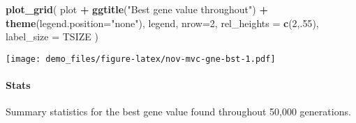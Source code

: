 \documentclass[]{book}
\newenvironment{Shaded}{\begin{snugshade}}{\end{snugshade}}
\newcommand{\DataTypeTok}[1]{\textcolor[rgb]{0.13,0.29,0.53}{#1}}
\newcommand{\DecValTok}[1]{\textcolor[rgb]{0.00,0.00,0.81}{#1}}
\newcommand{\KeywordTok}[1]{\textcolor[rgb]{0.13,0.29,0.53}{\textbf{#1}}}
\newcommand{\NormalTok}[1]{#1}
\newcommand{\OperatorTok}[1]{\textcolor[rgb]{0.81,0.36,0.00}{\textbf{#1}}}
\newcommand{\OtherTok}[1]{\textcolor[rgb]{0.56,0.35,0.01}{#1}}
\newcommand{\StringTok}[1]{\textcolor[rgb]{0.31,0.60,0.02}{#1}}
\let\oldparagraph\paragraph
\renewcommand{\paragraph}[1]{\oldparagraph{#1}\mbox{}}
\begin{document}
\begin{Shaded}
\begin{Highlighting}[]
\KeywordTok{plot_grid}\NormalTok{(}
\NormalTok{  plot }\OperatorTok{+}
\StringTok{    }\KeywordTok{ggtitle}\NormalTok{(}\StringTok{"Best gene value throughout"}\NormalTok{) }\OperatorTok{+}
\StringTok{    }\KeywordTok{theme}\NormalTok{(}\DataTypeTok{legend.position=}\StringTok{"none"}\NormalTok{),}
\NormalTok{  legend,}
  \DataTypeTok{nrow=}\DecValTok{2}\NormalTok{,}
  \DataTypeTok{rel_heights =} \KeywordTok{c}\NormalTok{(}\DecValTok{2}\NormalTok{,.}\DecValTok{55}\NormalTok{),}
  \DataTypeTok{label_size =}\NormalTok{ TSIZE}
\NormalTok{)}
\end{Highlighting}
\end{Shaded}

\texttt{[image: demo\_files/figure-latex/nov-mvc-gne-bst-1.pdf]}

\hypertarget{stats-87}{%
\paragraph{Stats}\label{stats-87}}

Summary statistics for the best gene value found throughout 50,000 generations.

\begin{Shaded}
\end{Shaded}
\end{document}
